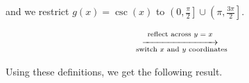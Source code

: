 \documentclass[12pt]{ximera}
\begin{document}
and we restrict $g(x) = \csc(x)$ to $\left(0, \frac{\pi}{2}\right] \cup \left( \pi, \frac{3\pi}{2}\right]$.  

\[ \begin{array}{ccc}



&

\stackrel{\stackrel{\mbox{\scriptsize reflect across $y=x$}}{\xrightarrow{\hspace{1in}}}}{\mbox{ \scriptsize switch $x$ and $y$ coordinates}} 

&



\end{array}\]

Using these definitions, we get the following result.

\smallskip

\end{document}
